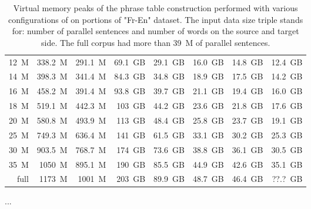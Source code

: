 \begin{table}[ht]
\begin{tabular}{ | r | r | r | r | r | r | r | r | }
\hline
12~M & 338.2~M & 291.1~M & 69.1~GB & 29.1~GB & 16.0~GB & 14.8~GB & 12.4~GB \\
14~M & 398.3~M & 341.4~M & 84.3~GB & 34.8~GB & 18.9~GB & 17.5~GB & 14.2~GB \\
16~M & 458.2~M & 391.4~M & 93.8~GB & 39.7~GB & 21.1~GB & 19.4~GB & 16.0~GB \\
18~M & 519.1~M & 442.3~M & 103~GB & 44.2~GB & 23.6~GB & 21.8~GB & 17.6~GB \\
20~M & 580.8~M & 493.9~M & 113~GB & 48.4~GB & 25.8~GB & 23.7~GB & 19.1~GB \\
\hline
25~M & 749.3~M & 636.4~M & 141~GB & 61.5~GB & 33.1~GB & 30.2~GB & 25.3~GB \\
30~M & 903.5~M & 768.7~M & 174~GB & 73.6~GB & 38.8~GB & 36.1~GB & 30.5~GB \\
\hline
35~M & 1050~M & 895.1~M & 190~GB & 85.5~GB & 44.9~GB & 42.6~GB & 35.1~GB \\
full & 1173~M & 1001~M & 203~GB & 89.9~GB & 48.7~GB & 46.4~GB & ??.?~GB \\ %
\hline
\end{tabular}
\caption{\label{fr-en-memory-benchmarking}
Virtual memory peaks of the phrase table construction performed with
various configurations of \eppex{} on portions of "Fr-En" dataset.
The input data size triple stands for: number of parallel sentences and number of words on the source and target side.
The full corpus had more than 39~M of parallel sentences.}
\end{table}

...

